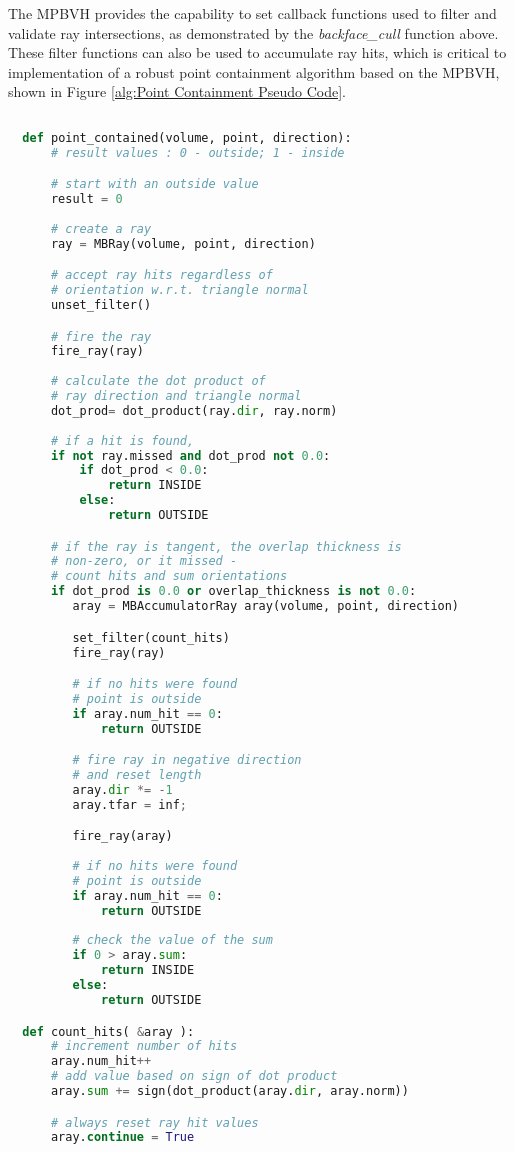 The MPBVH provides the capability to set callback functions used to filter and
validate ray intersections, as demonstrated by the \textit{backface\_cull}
function above. These filter functions can also be used to accumulate ray hits,
which is critical to implementation of a robust point containment algorithm
based on the MPBVH, shown in Figure \ref{alg:Point Containment Pseudo Code}.

\begin{lstlisting}[language=Python,basicstyle=\tiny,caption={Algorithm for point containment within a volume.},
    label={alg:Point Containment Pseudo Code},captionpos=b]
  
  def point_contained(volume, point, direction):
      # result values : 0 - outside; 1 - inside

      # start with an outside value
      result = 0
  
      # create a ray
      ray = MBRay(volume, point, direction)

      # accept ray hits regardless of
      # orientation w.r.t. triangle normal
      unset_filter()

      # fire the ray
      fire_ray(ray)
      
      # calculate the dot product of
      # ray direction and triangle normal
      dot_prod= dot_product(ray.dir, ray.norm)
      
      # if a hit is found, 
      if not ray.missed and dot_prod not 0.0:
          if dot_prod < 0.0:
              return INSIDE
          else:
              return OUTSIDE

      # if the ray is tangent, the overlap thickness is
      # non-zero, or it missed - 
      # count hits and sum orientations
      if dot_prod is 0.0 or overlap_thickness is not 0.0:
         aray = MBAccumulatorRay aray(volume, point, direction)

         set_filter(count_hits)
         fire_ray(ray)

         # if no hits were found
         # point is outside
         if aray.num_hit == 0:
             return OUTSIDE

         # fire ray in negative direction
         # and reset length
         aray.dir *= -1
         aray.tfar = inf;

         fire_ray(aray)
         
         # if no hits were found
         # point is outside
         if aray.num_hit == 0:
             return OUTSIDE
            
         # check the value of the sum
         if 0 > aray.sum:
             return INSIDE
         else:
             return OUTSIDE

  def count_hits( &aray ):
      # increment number of hits
      aray.num_hit++
      # add value based on sign of dot product
      aray.sum += sign(dot_product(aray.dir, aray.norm))

      # always reset ray hit values
      aray.continue = True

\end{lstlisting}

